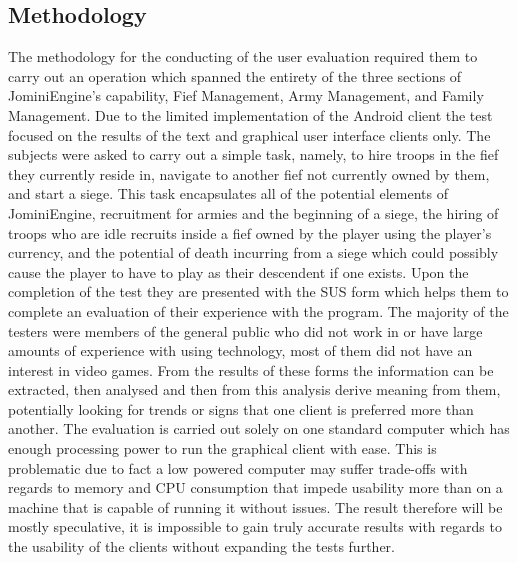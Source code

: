 \documentclass{article}
\begin{document}
\subsection{Methodology}
The methodology for the conducting of the user evaluation required them to carry out an operation which spanned the entirety of the three sections of JominiEngine’s capability, Fief Management, Army Management, and Family Management. Due to the limited implementation of the Android client the test focused on the results of the text and graphical user interface clients only. The subjects were asked to carry out a simple task, namely, to hire troops in the fief they currently reside in, navigate to another fief not currently owned by them, and start a siege. This task encapsulates all of the potential elements of JominiEngine, recruitment for armies and the beginning of a siege, the hiring of troops who are idle recruits inside a fief owned by the player using the player’s currency, and the potential of death incurring from a siege which could possibly cause the player to have to play as their descendent if one exists. Upon the completion of the test they are presented with the SUS form which helps them to complete an evaluation of their experience with the program. The majority of the testers were members of the general public who did not work in or have large amounts of experience with using technology, most of them did not have an interest in video games. From the results of these forms the information can be extracted, then analysed and then from this analysis derive meaning from them, potentially looking for trends or signs that one client is preferred more than another. The evaluation is carried out solely on one standard computer which has enough processing power to run the graphical client with ease. This is problematic due to fact a low powered computer may suffer trade-offs with regards to memory and CPU consumption that impede usability more than on a machine that is capable of running it without issues. The result therefore will be mostly speculative, it is impossible to gain truly accurate results with regards to the usability of the clients without expanding the tests further.
\end{document}
